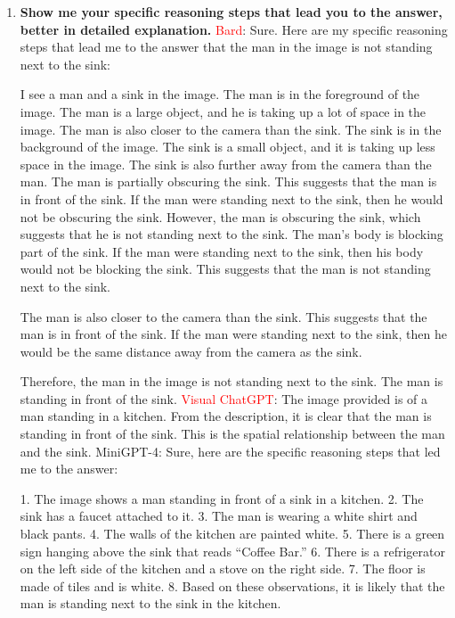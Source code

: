 \begin{enumerate}
    Therefore, the man in the image is not standing next to the sink. The man is standing in front of the sink.
    \subitem \textcolor{red}{Visual ChatGPT}: The man is standing in front of the sink in the kitchen.
    \subitem MiniGPT-4: Yes, the man is standing next to the sink.
    \item \textbf{Show me your specific reasoning steps that lead you to the answer, better in detailed explanation.}
    \subitem \textcolor{Red}{Bard}: 
    Sure. Here are my specific reasoning steps that lead me to the answer that the man in the image is not standing next to the sink:
    
    I see a man and a sink in the image.
    The man is in the foreground of the image. The man is a large object, and he is taking up a lot of space in the image. The man is also closer to the camera than the sink.
    The sink is in the background of the image. The sink is a small object, and it is taking up less space in the image. The sink is also further away from the camera than the man.
    The man is partially obscuring the sink. This suggests that the man is in front of the sink.
    If the man were standing next to the sink, then he would not be obscuring the sink. However, the man is obscuring the sink, which suggests that he is not standing next to the sink.
    The man's body is blocking part of the sink. If the man were standing next to the sink, then his body would not be blocking the sink. This suggests that the man is not standing next to the sink.
    
    The man is also closer to the camera than the sink. This suggests that the man is in front of the sink. If the man were standing next to the sink, then he would be the same distance away from the camera as the sink.
    
    Therefore, the man in the image is not standing next to the sink. The man is standing in front of the sink.
    \subitem \textcolor{red}{Visual ChatGPT}: The image provided is of a man standing in a kitchen. From the description, it is clear that the man is standing in front of the sink. This is the spatial relationship between the man and the sink.
    \subitem MiniGPT-4: Sure, here are the specific reasoning steps that led me to the answer:

    1. The image shows a man standing in front of a sink in a kitchen.
    2. The sink has a faucet attached to it.
    3. The man is wearing a white shirt and black pants.
    4. The walls of the kitchen are painted white.
    5. There is a green sign hanging above the sink that reads “Coffee Bar.”
    6. There is a refrigerator on the left side of the kitchen and a stove on the right side.
    7. The floor is made of tiles and is white.
    8. Based on these observations, it is likely that the man is standing next to the sink in the kitchen.
\end{enumerate}
